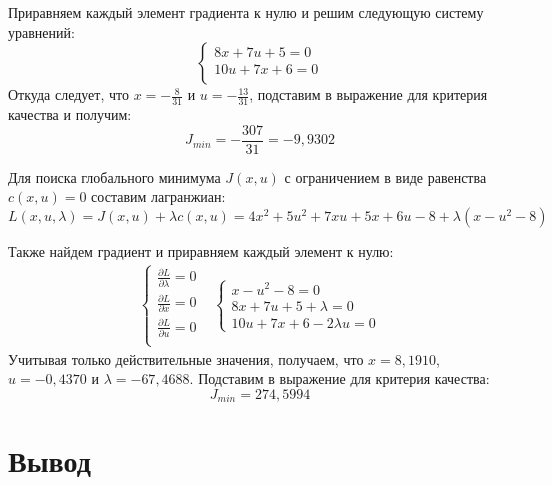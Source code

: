 \documentclass[14pt, a4paper]{extarticle}
\begin{document}
	Приравняем каждый элемент градиента к нулю и решим следующую систему уравнений:
	$$\begin{cases}
		8x+7u+5=0 \\
		10u+7x+6=0 \\
	\end{cases}$$
	Откуда следует, что $x=-\frac{8}{31}$ и $u=-\frac{13}{31}$, подставим в выражение для критерия качества и получим:
	$$J_{min}=-\frac{307}{31}=-9,9302$$
	
	Для поиска глобального минимума $J(x,u)$ с ограничением в виде равенства $c(x,u)=0$ составим лагранжиан:
	$$L(x,u,\lambda)=J(x,u) + \lambda c(x,u) = 4x^2+5u^2+7xu+5x+6u-8 + \lambda (x-u^2-8)$$
	
	Также найдем градиент и приравняем каждый элемент к нулю:
	$$\begin{matrix}
		\begin{cases}
			\frac{\partial L}{\partial \lambda}=0 \\
			\frac{\partial L}{\partial x}=0 \\
			\frac{\partial L}{\partial u}=0 \\
		\end{cases} &
		\begin{cases}
			x-u^2-8 = 0 \\
			8x+7u+5+\lambda = 0 \\
			10u+7x+6-2\lambda u = 0
		\end{cases}
	\end{matrix}$$
	Учитывая только действительные значения, получаем, что $x=8,1910$, $u=-0,4370$ и $\lambda=-67,4688$. Подставим в выражение для критерия качества:
	$$J_{min} = 274,5994$$
	
	\newpage
	
	\section*{Вывод}
	

	
\end{document}
